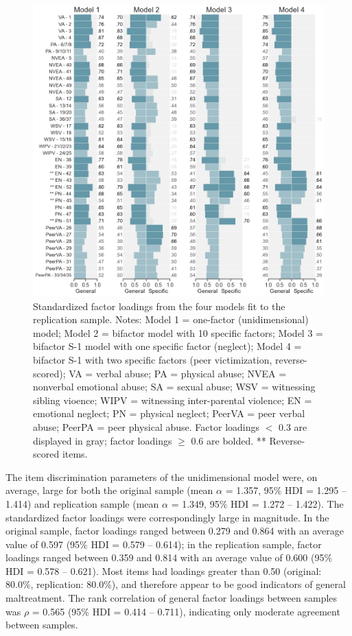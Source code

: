 \documentclass[letterpaper,man,natbib,noextraspace,floatsintext,longtable,12pt]{apa6}
\begin{document}
\begin{figure}[tp]
    \centering
    \includegraphics[width=1.1\textwidth,center]{figures/fig03.png}
    \captionsetup{width=1.1\textwidth}
    \caption{Standardized factor loadings from the four models fit to the replication sample. Notes: Model 1 = one-factor (unidimensional) model; Model 2 = bifactor model with 10 specific factors; Model 3 = bifactor S-1 model with one specific factor (neglect); Model 4 = bifactor S-1 with two specific factors (peer victimization, reverse-scored); VA = verbal abuse; PA = physical abuse; NVEA = nonverbal emotional abuse; SA = sexual abuse; WSV = witnessing sibling vioence; WIPV = witnessing inter-parental violence; EN = emotional neglect; PN = physical neglect; PeerVA = peer verbal abuse; PeerPA = peer physical abuse. Factor loadings $<$ 0.3 are displayed in gray; factor loadings $\geq$ 0.6 are bolded.  ** Reverse-scored items.}
    \label{fig:loadings_online}
\end{figure}

The item discrimination parameters of the unidimensional model were, on average, large for both the original sample (mean $\alpha$ = 1.357, 95\% HDI = 1.295 -- 1.414) and replication sample (mean $\alpha$ = 1.349, 95\% HDI = 1.272 -- 1.422). The standardized factor loadings were correspondingly large in magnitude. In the original sample, factor loadings ranged between 0.279 and 0.864 with an average value of 0.597 (95\% HDI = 0.579 -- 0.614); in the replication sample, factor loadings ranged between 0.359 and 0.814 with an average value of 0.600 (95\% HDI = 0.578 -- 0.621). Most items had loadings greater than 0.50 (original: 80.0\%, replication: 80.0\%), and therefore appear to be good indicators of general maltreatment. The rank correlation of general factor loadings between samples was $\rho$ = 0.565 (95\% HDI = 0.414 -- 0.711), indicating only moderate agreement between samples.
\end{document}
